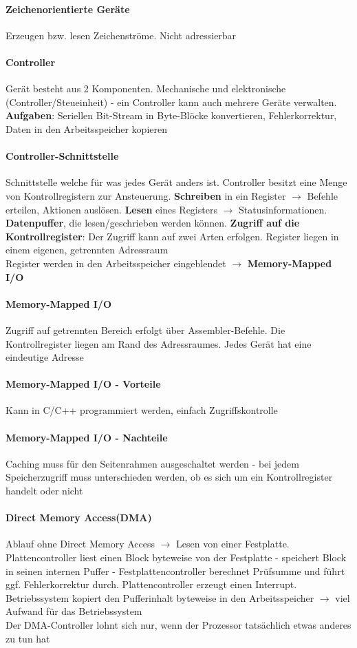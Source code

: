\documentclass[10pt,a4paper,landscape]{article}
\begin{document}
\begin{multicols*}{3}
	\paragraph{Zeichenorientierte Geräte} Erzeugen bzw. lesen Zeichenströme. Nicht adressierbar
	\paragraph{Controller} Gerät besteht aus 2 Komponenten. Mechanische und elektronische (Controller/Steueinheit) - ein Controller kann auch mehrere Geräte verwalten. \textbf{Aufgaben}: Seriellen Bit-Stream in Byte-Blöcke konvertieren, Fehlerkorrektur, Daten in den Arbeitsspeicher kopieren
	\paragraph{Controller-Schnittstelle} Schnittstelle welche für was jedes Gerät anders ist. Controller besitzt eine Menge von Kontrollregistern zur Ansteuerung. \textbf{Schreiben} in ein Register $\rightarrow$ Befehle erteilen, Aktionen auslösen. \textbf{Lesen} eines Registers $\rightarrow$ Statusinformationen. \textbf{Datenpuffer}, die lesen/geschrieben werden können. \textbf{Zugriff auf die Kontrollregister}: Der Zugriff kann auf zwei Arten erfolgen. Register liegen in einem eigenen, getrennten Adressraum\\
	Register werden in den Arbeitsspeicher eingeblendet $\rightarrow$ \textbf{Memory-Mapped I/O}
	\paragraph{Memory-Mapped I/O} Zugriff auf getrennten Bereich erfolgt über Assembler-Befehle. Die Kontrollregister liegen am Rand des Adressraumes. Jedes Gerät hat eine eindeutige Adresse
	\paragraph{Memory-Mapped I/O - Vorteile} Kann in C/C++ programmiert werden, einfach Zugriffskontrolle
	\paragraph{Memory-Mapped I/O - Nachteile} Caching muss für den Seitenrahmen ausgeschaltet werden - bei jedem Speicherzugriff muss unterschieden werden, ob es sich um ein Kontrollregister handelt oder nicht
	\paragraph{Direct Memory Access(DMA)} Ablauf ohne Direct Memory Access $\rightarrow$ Lesen von einer Festplatte. Plattencontroller liest einen Block byteweise von der Festplatte - speichert Block in seinen internen Puffer - Festplattencontroller berechnet Prüfsumme und führt ggf. Fehlerkorrektur durch. Plattencontroller erzeugt einen Interrupt. Betriebssystem kopiert den Pufferinhalt byteweise in den Arbeitsspeicher $\rightarrow$ viel Aufwand für das Betriebssystem\\
	Der DMA-Controller lohnt sich nur, wenn der Prozessor tatsächlich etwas anderes zu tun hat

\end{multicols*}
\end{document}
